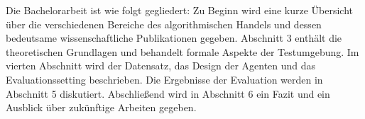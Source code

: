 Die Bachelorarbeit ist wie folgt gegliedert: Zu Beginn wird eine kurze Übersicht über die verschiedenen Bereiche des algorithmischen Handels und dessen bedeutsame wissenschaftliche Publikationen gegeben. Abschnitt 3 enthält die theoretischen Grundlagen und behandelt formale Aspekte der Testumgebung. 
Im vierten Abschnitt wird der Datensatz, das Design der Agenten und das Evaluationssetting beschrieben. Die Ergebnisse der Evaluation werden in Abschnitt 5 diskutiert. Abschließend wird in Abschnitt 6 ein Fazit und ein Ausblick über zukünftige Arbeiten gegeben.


